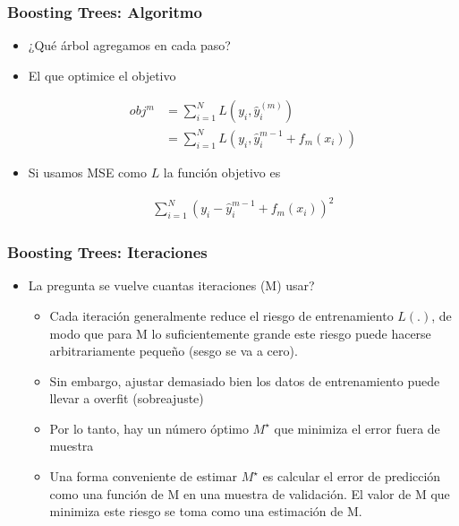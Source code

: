 \documentclass[
  shownotes,
  xcolor={svgnames},
  hyperref={colorlinks,citecolor=DarkBlue,linkcolor=DarkRed,urlcolor=DarkBlue}
  , aspectratio=169]{beamer}
\begin{document}
\begin{frame}[fragile]
\frametitle{Boosting Trees: Algoritmo}

\begin{itemize}


\item ¿Qué árbol agregamos en cada paso?
\item El que optimice el objetivo

\begin{align}
obj^m &= \sum_{i=1}^N L(y_i,\hat{y}_i^{(m)}) \\
     &= \sum_{i=1}^N L(y_i,\hat{y}_i^{m-1} + f_m(x_i))
\end{align}

\item Si usamos MSE como $L$ la función objetivo es

\begin{align}
\sum_{i=1}^N (y_i-\hat{y}_i^{m-1} + f_m(x_i))^2
\end{align}

\end{itemize}
\end{frame}
\begin{frame}[fragile]
\frametitle{Boosting Trees: Iteraciones}

\begin{itemize}

\item La pregunta se vuelve cuantas iteraciones (M) usar?
\begin{itemize}
\medskip
  
  \item Cada iteración generalmente reduce el riesgo de entrenamiento $L (.)$, de modo que para M lo suficientemente grande este riesgo puede hacerse arbitrariamente pequeño (sesgo se va a cero).
  \medskip
  \item Sin embargo, ajustar demasiado bien los datos de entrenamiento puede llevar a overfit (sobreajuste)
  \medskip
  \item Por lo tanto, hay un número óptimo $ M^\star$ que minimiza el error fuera de muestra
  \medskip
  \item Una forma conveniente de estimar $ M^\star$ es calcular el error de predicción como una función de M en una muestra de validación. El valor de M que minimiza este riesgo se toma como una estimación de M. 

  \end{itemize}
\end{itemize}
\end{frame}
\end{document}
